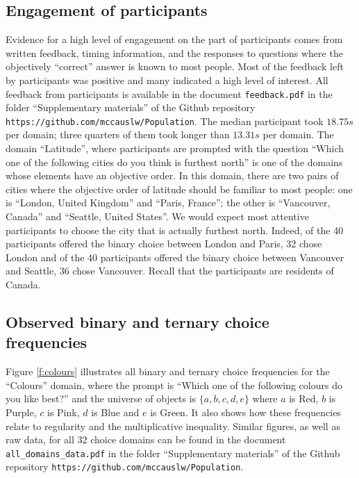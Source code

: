 \documentclass[11pt,letter]{article}
\begin{document}
\subsection{Engagement of participants}

Evidence for a high level of engagement on the part of participants comes from written feedback, timing information, and the responses to questions where the objectively ``correct'' answer is known to most people.
Most of the feedback left by participants was positive and many indicated a high level of interest.
All feedback from participants is available in the document \texttt{feedback.pdf} in the folder ``Supplementary materials'' of the Github repository \texttt{https://github.com/mccauslw/Population}.
The median participant took $18.75s$ per domain; three quarters of them took longer than $13.31s$ per domain.
The domain ``Latitude'', where participants are prompted with the question ``Which one of the following cities do you think is furthest north'' is one of the domains whose elements have an objective order.
In this domain, there are two pairs of cities where the objective order of latitude should be familiar to most people: one is ``London, United Kingdom'' and ``Paris, France''; the other is ``Vancouver, Canada'' and ``Seattle, United States''.
We would expect most attentive participants to choose the city that is actually furthest north.
Indeed, of the 40 participants offered the binary choice between London and Paris, 32 chose London and of the 40 participants offered the binary choice between Vancouver and Seattle, 36 chose Vancouver.
Recall that the participants are residents of Canada.

\subsection{Observed binary and ternary choice frequencies}

Figure \ref{f:colours} illustrates all binary and ternary choice frequencies for the ``Colours'' domain, where the prompt is ``Which one of the following colours do you like best?'' and the universe of objects is $\{a,b,c,d,e\}$ where $a$ is Red, $b$ is Purple, $c$ is Pink, $d$ is Blue and $e$ is Green.
It also shows how these frequencies relate to regularity and the multiplicative inequality.
Similar figures, as well as raw data, for all 32 choice domains can be found in the document \texttt{all\_domains\_data.pdf} in the folder ``Supplementary materials'' of the Github repository \texttt{https://github.com/mccauslw/Population}.
\end{document}

